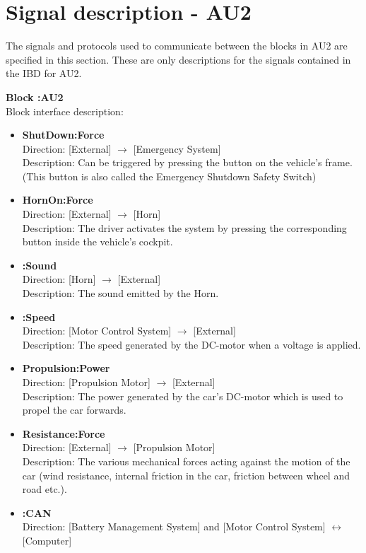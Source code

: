 \section{Signal description - AU2}
The signals and protocols used to communicate between the blocks in AU2 are specified in this section. These are only descriptions for the signals contained in the IBD for AU2.

\textbf{Block :AU2}\\
Block interface description:
\begin{itemize}
	\item \textbf{ShutDown:Force}\\
	Direction: [External] $\rightarrow$ [Emergency System]\\
	Description: Can be triggered by pressing the button on the vehicle's frame. (This button is also called the Emergency Shutdown Safety Switch)	
	\item \textbf{HornOn:Force}\\
	Direction: [External] $\rightarrow$ [Horn]\\
	Description: The driver activates the system by pressing the corresponding button inside the vehicle's cockpit.
	\item \textbf{:Sound}\\
	Direction: [Horn] $\rightarrow$ [External]\\
	Description: The sound emitted by the Horn.
	\item \textbf{:Speed}\\
	Direction: [Motor Control System] $\rightarrow$ [External]\\
	Description: The speed generated by the DC-motor when a voltage is applied.
	\item \textbf{Propulsion:Power}\\
	Direction: [Propulsion Motor] $\rightarrow$ [External]\\
	Description: The power generated by the car's DC-motor which is used to propel the car forwards. 
	\item \textbf{Resistance:Force}\\
	Direction: [External] $\rightarrow$ [Propulsion Motor]\\
	Description: The various mechanical forces acting against the motion of the car (wind resistance, internal friction in the car, friction between wheel and road etc.).
	\item \textbf{:CAN}\\
	Direction: [Battery Management System] and [Motor Control System] $\leftrightarrow$ [Computer]\\

\end{itemize}
